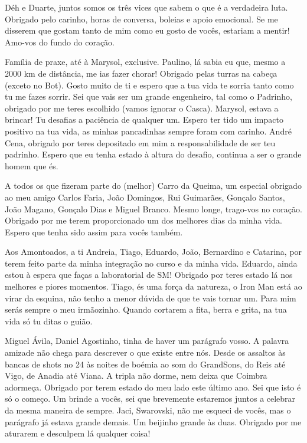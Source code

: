 Déh e Duarte, juntos somos os três vices que sabem o que é a verdadeira luta. Obrigado pelo carinho, horas de conversa, boleias e apoio emocional. Se me disserem que gostam tanto de mim como eu gosto de vocês, estariam a mentir! Amo-vos do fundo do coração.

Família de praxe, até à Marysol, exclusive. Paulino, lá sabia eu que, mesmo a 2000 km de distância, me ias fazer chorar! Obrigado pelas turras na cabeça (exceto no Bot). Gosto muito de ti e espero que a tua vida te sorria tanto como tu me fazes sorrir. Sei que vais ser um grande engenheiro, tal como o Padrinho, obrigado por me teres escolhido (vamos ignorar o Casca). Marysol, estava a brincar! Tu desafias a paciência de qualquer um. Espero ter tido um impacto positivo na tua vida, as minhas pancadinhas sempre foram com carinho. André Cena, obrigado por teres depositado em mim a responsabilidade de ser teu padrinho. Espero que eu tenha estado à altura do desafio, continua a ser o grande homem que és.

A todos os que fizeram parte do (melhor) Carro da Queima, um especial obrigado ao meu amigo Carlos Faria, João Domingos, Rui Guimarães, Gonçalo Santos, João Magano, Gonçalo Dias e Miguel Branco. Mesmo longe, trago-vos no coração. Obrigado por me terem proporcionado um dos melhores dias da minha vida. Espero que tenha sido assim para vocês também.

Aos Amontoados, a ti Andreia, Tiago, Eduardo, João, Bernardino e Catarina, por terem feito parte da minha integração no curso e da minha vida. Eduardo, ainda estou à espera que faças a laboratorial de SM! Obrigado por teres estado lá nos melhores e piores momentos. Tiago, és uma força da natureza, o Iron Man está ao virar da esquina, não tenho a menor dúvida de que te vais tornar um. Para mim serás sempre o meu irmãozinho. Quando cortarem a fita, berra e grita, na tua vida só tu ditas o guião.

Miguel Ávila, Daniel Agostinho, tinha de haver um parágrafo vosso. A palavra amizade não chega para descrever o que existe entre nós. Desde os assaltos às bancas de shots no 24 às noites de boémia ao som do GrandSons, do Reis até Vigo, de Anadia até Viana. A tripla não dorme, nem deixa que Coimbra adormeça. Obrigado por terem estado do meu lado este último ano. Sei que isto é só o começo. Um brinde a vocês, sei que brevemente estaremos juntos a celebrar da mesma maneira de sempre. Jaci, Swarovski, não me esqueci de vocês, mas o parágrafo já estava grande demais. Um beijinho grande às duas. Obrigado por me aturarem e desculpem lá qualquer coisa!

